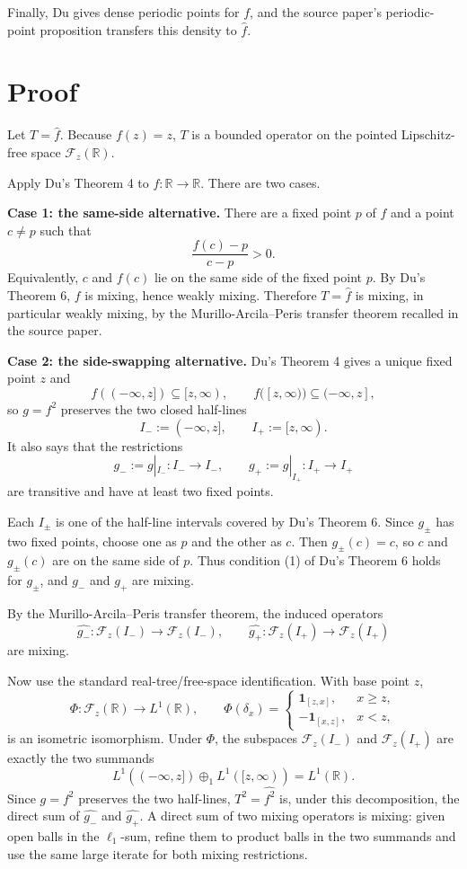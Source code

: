 \documentclass[11pt]{article}
\newcommand{\F}{\mathcal F}
\newcommand{\R}{\mathbb R}
\newcommand{\1}{\mathbf 1}
\begin{document}
Finally, Du gives dense periodic points for \(f\), and the source paper's
periodic-point proposition transfers this density to \(\widehat f\).

\section*{Proof}

Let \(T=\widehat f\).  Because \(f(z)=z\), \(T\) is a bounded operator on the
pointed Lipschitz-free space \(\F_z(\R)\).

Apply Du's Theorem 4 to \(f:\R\to\R\).  There are two cases.

\medskip
\noindent\textbf{Case 1: the same-side alternative.}
There are a fixed point \(p\) of \(f\) and a point \(c\ne p\) such that
\[
   \frac{f(c)-p}{c-p}>0.
\]
Equivalently, \(c\) and \(f(c)\) lie on the same side of the fixed point
\(p\).  By Du's Theorem 6, \(f\) is mixing, hence weakly mixing.  Therefore
\(T=\widehat f\) is mixing, in particular weakly mixing, by the
Murillo-Arcila--Peris transfer theorem recalled in the source paper.

\medskip
\noindent\textbf{Case 2: the side-swapping alternative.}
Du's Theorem 4 gives a unique fixed point \(z\) and
\[
  f((-\infty,z])\subseteq [z,\infty),\qquad
  f([z,\infty))\subseteq (-\infty,z],
\]
so \(g=f^2\) preserves the two closed half-lines
\[
  I_-:=(-\infty,z],\qquad I_+:=[z,\infty).
\]
It also says that the restrictions
\[
  g_-:=g|_{I_-}:I_-\to I_-,
  \qquad
  g_+:=g|_{I_+}:I_+\to I_+
\]
are transitive and have at least two fixed points.

Each \(I_\pm\) is one of the half-line intervals covered by Du's Theorem 6.
Since \(g_\pm\) has two fixed points, choose one as \(p\) and the other as
\(c\).  Then \(g_\pm(c)=c\), so \(c\) and \(g_\pm(c)\) are on the same side of
\(p\).  Thus condition (1) of Du's Theorem 6 holds for \(g_\pm\), and \(g_-\)
and \(g_+\) are mixing.

By the Murillo-Arcila--Peris transfer theorem, the induced operators
\[
  \widehat{g_-}:\F_z(I_-)\to\F_z(I_-),
  \qquad
  \widehat{g_+}:\F_z(I_+)\to\F_z(I_+)
\]
are mixing.

Now use the standard real-tree/free-space identification.  With base point
\(z\),
\[
   \Phi:\F_z(\R)\longrightarrow L^1(\R),\qquad
   \Phi(\delta_x)=
   \begin{cases}
      \1_{[z,x]}, & x\ge z,\\
      -\1_{[x,z]}, & x<z,
   \end{cases}
\]
is an isometric isomorphism.  Under \(\Phi\), the subspaces
\(\F_z(I_-)\) and \(\F_z(I_+)\) are exactly the two summands
\[
   L^1((-\infty,z])\oplus_1 L^1([z,\infty))=L^1(\R).
\]
Since \(g=f^2\) preserves the two half-lines, \(T^2=\widehat{f^2}\) is, under
this decomposition, the direct sum of \(\widehat{g_-}\) and \(\widehat{g_+}\).
A direct sum of two mixing operators is mixing: given open balls in the
\(\ell_1\)-sum, refine them to product balls in the two summands and use the
same large iterate for both mixing restrictions.
\end{document}
